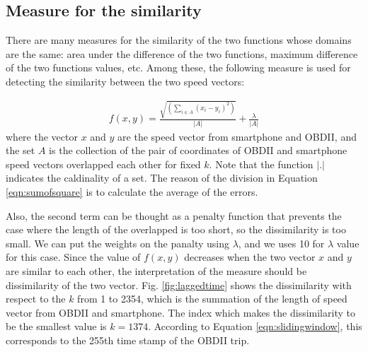\documentclass[letterpaper,9pt,twocolumn,twoside,]{pinp}
\begin{document}
\hypertarget{measure-for-the-similarity}{%
\subsection{Measure for the
similarity}\label{measure-for-the-similarity}}

There are many measures for the similarity of the two functions whose
domains are the same: area under the difference of the two functions,
maximum difference of the two functions values, etc. Among these, the
following measure is used for detecting the similarity between the two
speed vectors:

\begin{equation}
  \begin{aligned}
 f(x, y) = \frac{\sqrt{\left(\sum_{i\in A}\left(x_{i}-y_{i}\right)^{2}\right)}}{|A|} + \frac{\lambda}{|A|}
  \label{eqn:sumofsquare} 
  \end{aligned}
\end{equation} where the vector \(x\) and \(y\) are the speed vector
from smartphone and OBDII, and the set \(A\) is the collection of the
pair of coordinates of OBDII and smartphone speed vectors overlapped
each other for fixed \(k\). Note that the function \(|.|\) indicates the
caldinality of a set. The reason of the division in Equation
\ref{eqn:sumofsquare} is to calculate the average of the errors.

Also, the second term can be thought as a penalty function that prevents
the case where the length of the overlapped is too short, so the
dissimilarity is too small. We can put the weights on the panalty using
\(\lambda\), and we uses 10 for \(\lambda\) value for this case. Since
the value of \(f(x, y)\) decreases when the two vector \(x\) and \(y\)
are similar to each other, the interpretation of the measure should be
dissimilarity of the two vector. Fig. \ref{fig:laggedtime} shows the
dissimilarity with respect to the \(k\) from 1 to 2354, which is the
summation of the length of speed vector from OBDII and smartphone. The
index which makes the dissimilarity to be the smallest value is
\(k = 1374\). According to Equation \ref{eqn:slidingwindow}, this
corresponds to the 255th time stamp of the OBDII trip.
\end{document}
